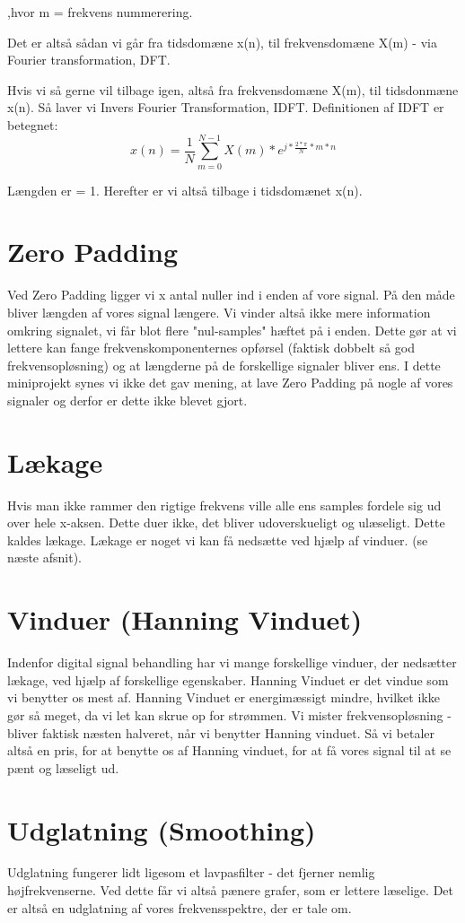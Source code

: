 \documentclass[12pt, letterpaper]{article}
\begin{document}
,hvor m = frekvens nummerering. 


Det er altså sådan vi går fra tidsdomæne x(n), til frekvensdomæne X(m) - via Fourier transformation, DFT. 

Hvis vi så gerne vil tilbage igen, altså fra frekvensdomæne X(m), til tidsdonmæne x(n). Så laver vi Invers Fourier Transformation, IDFT. 
Definitionen af IDFT er betegnet: 
$$x(n)= \frac{1}{N} \sum\limits_{m=0}^{N-1} X(m)*e^{j*\frac{2*\pi}{N}*m*n}$$

Længden er = 1. 
Herefter er vi altså tilbage i tidsdomænet x(n).

\section{Zero Padding}
Ved Zero Padding ligger vi x antal nuller ind i enden af vore signal. På den måde bliver længden af vores signal længere. Vi vinder altså ikke mere information omkring signalet, vi får blot flere "nul-samples" hæftet på i enden. 
Dette gør at vi lettere kan fange frekvenskomponenternes opførsel (faktisk dobbelt så god frekvensopløsning) og at længderne på de forskellige signaler bliver ens. 
I dette miniprojekt synes vi ikke det gav mening, at lave Zero Padding på nogle af vores signaler og derfor er dette ikke blevet gjort. 

\section{Lækage}
Hvis man ikke rammer den rigtige frekvens ville alle ens samples fordele sig ud over hele x-aksen. Dette duer ikke, det bliver udoverskueligt og ulæseligt. Dette kaldes lækage. Lækage er noget vi kan få nedsætte ved hjælp af vinduer. (se næste afsnit). 

\section{Vinduer (Hanning Vinduet)}
Indenfor digital signal behandling har vi mange forskellige vinduer, der nedsætter lækage, ved hjælp af forskellige egenskaber. 
Hanning Vinduet er det vindue som vi benytter os mest af. 
Hanning Vinduet er energimæssigt mindre, hvilket ikke gør så meget, da vi let kan skrue op for strømmen. 
Vi mister frekvensopløsning - bliver faktisk næsten halveret, når vi benytter Hanning vinduet. Så vi betaler altså en pris, for at benytte os af Hanning vinduet, for at få vores signal til at se pænt og læseligt ud. 

\section{Udglatning (Smoothing)}
Udglatning fungerer lidt ligesom et lavpasfilter - det fjerner nemlig højfrekvenserne. 
Ved dette får vi altså pænere grafer, som er lettere læselige. Det er altså en udglatning af vores frekvensspektre, der er tale om. 
\end{document}
